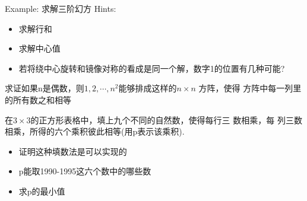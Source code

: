 \clearpage
Example: 求解三阶幻方
\clearpage
Hints:
\begin{itemize}
\item 求解行和
\item 求解中心值
\item 若将绕中心旋转和镜像对称的看成是同一个解，数字1的位置有几种可能?
\end{itemize}

\clearpage
求证如果n是偶数，则$1,2,\cdots,n^2$能够排成这样的$n\times n$
方阵，使得 方阵中每一列里的所有数之和相等

在$3\times 3$的正方形表格中，填上九个不同的自然数，使得每行三
数相乘，每 列三数相乘，所得的六个乘积彼此相等(用p表示该乘积).
\begin{itemize}
\item 证明这种填数法是可以实现的
\item p能取1990-1995这六个数中的哪些数
\item 求p的最小值
\end{itemize}


